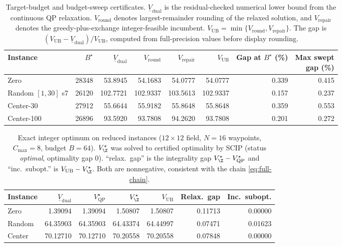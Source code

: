 \begin{table}[t]\centering\footnotesize\setlength{\tabcolsep}{3pt}
\caption{Target-budget and budget-sweep certificates. $\underline V_{\mathrm{dual}}$ is the
residual-checked numerical lower bound from the continuous QP relaxation.
$V_{\mathrm{round}}$ denotes largest-remainder rounding of the relaxed solution,
and $V_{\mathrm{repair}}$ denotes the greedy-plus-exchange integer-feasible
incumbent. $V_{\mathrm{UB}}=\min\{V_{\mathrm{round}},V_{\mathrm{repair}}\}$. The gap is
$(V_{\mathrm{UB}}-\underline V_{\mathrm{dual}})/V_{\mathrm{UB}}$, computed from
full-precision values before display rounding.}
\label{tab:target-gaps}
\begin{tabular}{lrrrrrrr}
\toprule
Instance & $B^\star$ & $\underline V_{\mathrm{dual}}$ & $V_{\mathrm{round}}$ &
$V_{\mathrm{repair}}$ & $V_{\mathrm{UB}}$ & \shortstack{Gap at\\$B^\star$ (\%)} &
\shortstack{Max swept\\gap (\%)}\\
\midrule
Zero               & 28348 &  53.8945 &  54.1683 &  54.0777 &  54.0777 & 0.339 & 0.415\\
Random $[1,30]$ s7 & 26120 & 102.7721 & 102.9337 & 103.5613 & 102.9337 & 0.157 & 0.237\\
Center-30          & 27912 &  55.6644 &  55.9182 &  55.8648 &  55.8648 & 0.359 & 0.553\\
Center-100         & 26896 &  93.5920 &  93.7808 &  94.2620 &  93.7808 & 0.201 & 0.272\\
\bottomrule
\end{tabular}
\end{table}

\begin{table}[t]\centering\small\setlength{\tabcolsep}{4pt}
\caption{Exact integer optimum on reduced instances ($12\times12$ field, $N=16$
waypoints, $C_{\max}=8$, budget $B=64$). $V_{\Z}^\star$ was solved to certified
optimality by SCIP (status \emph{optimal}, optimality gap $0$). ``relax.\ gap'' is
the integrality gap $V_{\Z}^\star-V_{\mathrm{QP}}^{\star}$ and ``inc.\ subopt.'' is
$V_{\mathrm{UB}}-V_{\Z}^\star$. Both are nonnegative, consistent with the chain
\eqref{eq:full-chain}.}
\label{tab:exact-miqp}
\begin{tabular}{lrrrrrr}
\toprule
Instance & $\underline V_{\mathrm{dual}}$ & $V_{\mathrm{QP}}^{\star}$ &
$V_{\Z}^\star$ & $V_{\mathrm{UB}}$ & Relax.\ gap & Inc.\ subopt.\\
\midrule
Zero   &  1.39094 &  1.39094 &  1.50807 &  1.50807 & 0.11713 & 0.00000\\
Random & 64.35903 & 64.35903 & 64.43374 & 64.44997 & 0.07471 & 0.01623\\
Center & 70.12710 & 70.12710 & 70.20558 & 70.20558 & 0.07848 & 0.00000\\
\bottomrule
\end{tabular}
\end{table}

